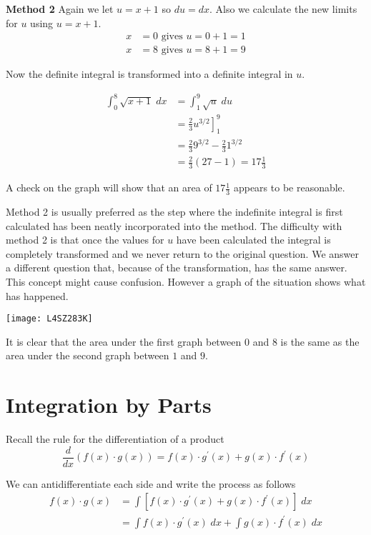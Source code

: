 \textbf{Method 2} 
Again we let $u =x +1$ so $d u =d x$. Also we calculate the new limits for $u$ using $u =x +1$.
\begin{align*}x &  = 0\text{ gives }u =0 +1 =1 \\
x &  = 8\text{ gives }u =8 +1 =9\end{align*}

Now the definite integral is transformed into a definite integral in $u$. 

\begin{align*}\int _{0}^{8}\sqrt{x +1}\; d x &  = \int _{1}^{9}\sqrt{u}\; d u \\
 &  = \left .\frac{2}{3} u^{3/2}\right ]_{1}^{9} \\
 &  = \frac{2}{3} 9^{3/2} -\frac{2}{3} 1^{3/2} \\
 &  = \frac{2}{3} \left (27 -1\right ) =17\frac{1}{3}\end{align*}

A check on the graph will show that an area of $17\frac{1}{3}$ appears to be reasonable. 

Method 2 is usually preferred as the step where the indefinite integral is first calculated has been neatly incorporated into the method. The difficulty with method 2 is that once the values for $u$ have been calculated the integral is completely transformed and we never return to the original question. We answer a different question that, because of the transformation, has the same answer. This concept might cause confusion. However a graph of the situation shows what has happened.   
\begin{center}\texttt{[image: L4SZ283K]}\end{center}
It is clear that the area under the first graph between $0$ and $8$ is the same as the area under the second graph between $1$ and $9$. 

\section{Integration by Parts}
Recall the rule for the differentiation of a product
\begin{equation*}\frac{d}{d x} \left (f (x) \cdot g (x)\right ) =f (x) \cdot g^{ \prime } (x) +g (x) \cdot f^{ \prime } (x)
\end{equation*}

We can antidifferentiate each side and write the process as follows
\begin{align*}f (x) \cdot g (x) &  = \int \left [f (x) \cdot g^{ \prime } (x) +g (x) \cdot f^{ \prime } (x)\right ]\; d x \\
 &  = \int f (x) \cdot g^{ \prime } (x)\; d x +\int g (x) \cdot f^{ \prime } (x)\; d x\end{align*}


